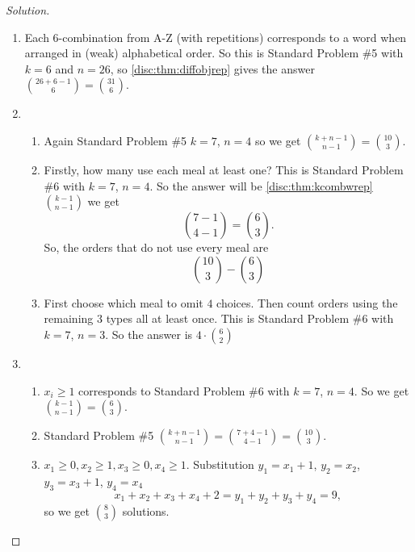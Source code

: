\documentclass[10pt, a4paper]{article}
\begin{document}
\begin{example}
    \begin{proof}[Solution]\renewcommand{\qedsymbol}{}
    \begin{enumerate}[label = E\arabic*]
        \item Each $6$-combination from A-Z (with repetitions) corresponds to a word when arranged in (weak) alphabetical order.
        So this is Standard Problem \#5 with $k = 6$ and $n = 26$,
        so \autoref{disc:thm:diffobjrep} gives the answer $\binom{26 + 6 - 1}{6} = \binom{31}{6}$.
        \item
        \begin{enumerate}[label = (\alph*)]
            \item Again Standard Problem \#5 $k = 7$, $n = 4$
            so we get $\binom{k + n - 1}{n - 1} = \binom{10}{3}$.
            \item Firstly, how many use each meal at least one?
            This is Standard Problem \#6 with $k = 7$, $n = 4$.
            So the answer will be \autoref{disc:thm:kcombwrep} $\binom{k - 1}{n - 1}$ we get
            \[
            \binom{7 - 1}{4 - 1} = \binom{6}{3}.
            \]
            So, the orders that do not use every meal are
            \[
            \binom{10}{3} - \binom{6}{3}
            \]
            \item First choose which meal to omit $4$ choices.
            Then count orders using the remaining $3$ types all at least once.
            This is Standard Problem \#6 with $k = 7$, $n = 3$.
            So the answer is $4 \cdot \binom{6}{2}$
        \end{enumerate}
        \item 
        \begin{enumerate}[label = (\alph*)]
            \item $x_i \geq 1$ corresponds to Standard Problem \#6 with $k = 7$, $n = 4$.
            So we get $\binom{k - 1}{n - 1} = \binom{6}{3}$.
            \item Standard Problem \#5 $\binom{k + n - 1}{n - 1} = \binom{7 + 4 - 1}{4 - 1} = \binom{10}{3}$.
            \item $x_1 \geq 0, x_2 \geq 1, x_3 \geq 0, x_4 \geq 1$. Substitution $y_1 = x_1 + 1$, $y_2 = x_2$, $y_3 = x_3 + 1$, $y_4 = x_4$
            \[
            x_1 + x_2 + x_3 + x_4 + 2 = y_1 + y_2 + y_3 + y_4 = 9,
            \]
            so we get $\binom{8}{3}$ solutions.
        \end{enumerate}
    \end{enumerate}
    \end{proof}
\end{example}
\end{document}
